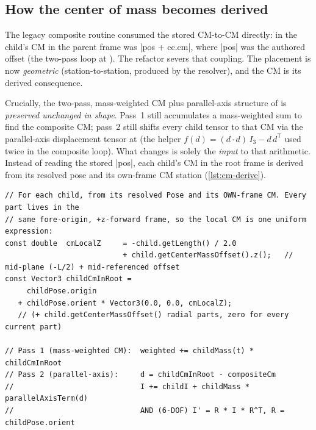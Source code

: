\subsection{How the center of mass becomes derived}

The legacy composite routine consumed the stored CM-to-CM  directly: in
 the child's CM in the parent frame was \cppinline|pos + cc.cm|, where
\cppinline|pos| was the authored offset (the two-pass loop at ). The
refactor severs that coupling. The placement is now \emph{geometric} (station-to-station, produced by
the resolver), and the CM is its derived consequence.

Crucially, the two-pass, mass-weighted CM plus parallel-axis structure of 
is \emph{preserved unchanged in shape}. Pass~1 still accumulates a mass-weighted sum to find the
composite CM; pass~2 still shifts every child tensor to that CM via the parallel-axis displacement
tensor  at  (the helper $f(d) = (d\cdot
d)\,I_3 - d\,d^{\mathsf T}$ used twice in the composite loop). What changes is solely the
\emph{input} to that arithmetic. Instead of reading the stored \cppinline|pos|, each child's CM in
the root frame is derived from its resolved pose and its own-frame CM station (\cref{lst:cm-derive}).

\begin{listing}[htbp]
\begin{verbatim}
// For each child, from its resolved Pose and its OWN-frame CM. Every part lives in the
// same fore-origin, +z-forward frame, so the local CM is one uniform expression:
const double  cmLocalZ     = -child.getLength() / 2.0
                           + child.getCenterMassOffset().z();   // mid-plane (-L/2) + mid-referenced offset
const Vector3 childCmInRoot =
     childPose.origin
   + childPose.orient * Vector3(0.0, 0.0, cmLocalZ);
   // (+ child.getCenterMassOffset() radial parts, zero for every current part)

// Pass 1 (mass-weighted CM):  weighted += childMass(t) * childCmInRoot
// Pass 2 (parallel-axis):     d = childCmInRoot - compositeCm
//                             I += childI + childMass * parallelAxisTerm(d)
//                             AND (6-DOF) I' = R * I * R^T, R = childPose.orient
\end{verbatim}
\caption{The CM derivation. The local CM station is $-L/2 + \code{getCenterMassOffset()}.z()$,
evaluated identically for every part in the one shared \zfwd{} frame (fore-plane origin)
(). There is no per-type adapter and no cone special
case.}\label{lst:cm-derive}
\end{listing}

